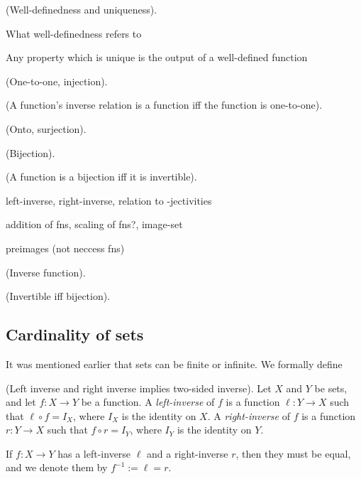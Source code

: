 \begin{remark}
    (Well-definedness and uniqueness).
    
    What well-definedness refers to
    
    Any property which is unique is the output of a well-defined function
\end{remark}

\begin{defn}
    (One-to-one, injection).
\end{defn}

\begin{theorem}
    (A function's inverse relation is a function iff the function is one-to-one).
\end{theorem}

\begin{defn}
    (Onto, surjection).
\end{defn}

\begin{defn}
    (Bijection).
\end{defn}

\begin{theorem}
    (A function is a bijection iff it is invertible).
\end{theorem}

left-inverse, right-inverse, relation to -jectivities

addition of fns, scaling of fns?, image-set

preimages (not neccess fns)

\begin{defn}
\label{ch::logic_pf_fns::defn::inverse_fn}

    (Inverse function).
\end{defn}

\begin{theorem}
\label{ch::logic_pf_fns::thm::invertible_iff_bijection}
    (Invertible iff bijection).
\end{theorem}

\subsection*{Cardinality of sets}

It was mentioned earlier that sets can be finite or infinite. We formally define

\begin{theorem}
    (Left inverse and right inverse implies two-sided inverse). Let $X$ and $Y$ be sets, and let $f:X \rightarrow Y$ be a function. A \textit{left-inverse} of $f$ is a function $\ell:Y \rightarrow X$ such that $\ell \circ f = I_X$, where $I_X$ is the identity on $X$. A \textit{right-inverse} of $f$ is a function $r:Y \rightarrow X$ such that $f \circ r = I_Y$, where $I_Y$ is the identity on $Y$.
    
    If $f:X \rightarrow Y$ has a left-inverse $\ell$ and a right-inverse $r$, then they must be equal, and we denote them by $f^{-1} := \ell = r$.
\end{theorem}

